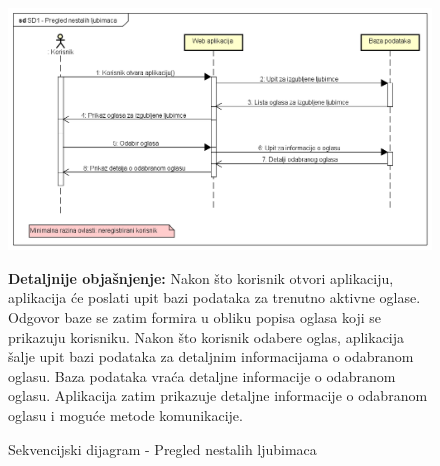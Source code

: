 				\begin{figure}[hp!]
					\centering
					\includegraphics[width=\textwidth]{slike/SD1 - Pregled nestalih ljubimaca.png}
					\caption{Sekvencijski dijagram - Pregled nestalih ljubimaca}
					\begin{flushleft}
						\textbf{Detaljnije objašnjenje:}
						Nakon što korisnik otvori aplikaciju, aplikacija će poslati upit bazi podataka za trenutno aktivne oglase. Odgovor baze se zatim formira u obliku popisa oglasa koji se prikazuju korisniku. Nakon što korisnik odabere oglas, aplikacija šalje upit bazi podataka za detaljnim informacijama o odabranom oglasu. Baza podataka vraća detaljne informacije o odabranom oglasu. Aplikacija zatim prikazuje detaljne informacije o odabranom oglasu i moguće metode komunikacije.
					\end{flushleft}
				\end{figure}
				\pagebreak
